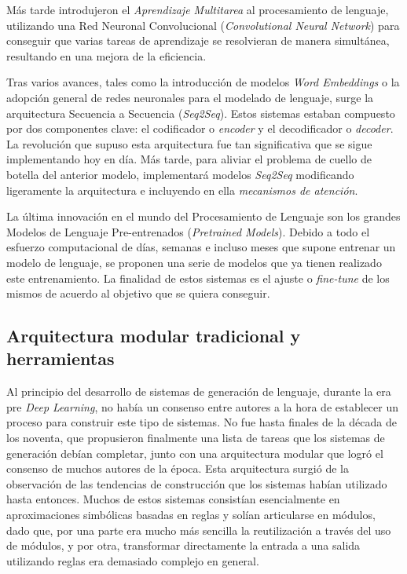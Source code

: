 Más tarde \cite{collobertWeston} introdujeron el \textit{Aprendizaje Multitarea} al procesamiento de lenguaje, utilizando una Red Neuronal Convolucional (\textit{Convolutional Neural Network}) para conseguir que varias tareas de aprendizaje se resolvieran de manera simultánea, resultando en una mejora de la eficiencia. 

Tras varios avances, tales como la introducción de modelos \textit{Word Embeddings} o la adopción general de redes neuronales para el modelado de lenguaje, surge la arquitectura Secuencia a Secuencia (\textit{Seq2Seq}). Estos sistemas estaban compuesto por dos componentes clave: el codificador o \textit{encoder} y el decodificador o \textit{decoder}. La revolución que supuso esta arquitectura fue tan significativa que se sigue implementando hoy en día. Más tarde, para aliviar el problema de cuello de botella del anterior modelo, \cite{Bahdanau} implementará modelos \textit{Seq2Seq} modificando ligeramente la arquitectura e incluyendo en ella \textit{mecanismos de atención}.

La última innovación en el mundo del Procesamiento de Lenguaje son los grandes Modelos de Lenguaje Pre-entrenados (\textit{Pretrained Models}). Debido a todo el esfuerzo computacional de días, semanas e incluso meses que supone entrenar un modelo de lenguaje, se proponen una serie de modelos que ya tienen realizado este entrenamiento. La finalidad de estos sistemas es el ajuste o \textit{fine-tune} de los mismos de acuerdo al objetivo que se quiera conseguir.

\subsection{Arquitectura modular tradicional y herramientas}
\label{sec:arquitectura_tradicional}
Al principio del desarrollo de sistemas de generación de lenguaje, durante la era pre \textit{Deep Learning}, no había un consenso entre autores a la hora de establecer un proceso para construir este tipo de sistemas. No fue hasta finales de la década de los noventa, que \cite{reiter1997building} propusieron finalmente una lista de tareas que los sistemas de generación debían completar, junto con una arquitectura modular que logró el consenso de muchos autores de la época. Esta arquitectura surgió de la observación de las tendencias de construcción que los sistemas habían utilizado hasta entonces. Muchos de estos sistemas consistían esencialmente en aproximaciones simbólicas basadas en reglas y solían articularse en módulos, dado que, por una parte era mucho más sencilla la reutilización a través del uso de módulos, y por otra, transformar directamente la entrada a una salida utilizando reglas era demasiado complejo en general. 
 

